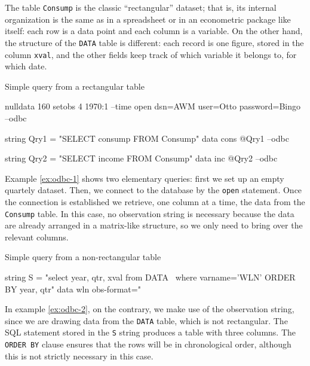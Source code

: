 The table \texttt{Consump} is the classic ``rectangular'' dataset;
that is, its internal organization is the same as in a spreadsheet or
in an econometric package like  itself: each row is a data
point and each column is a variable. On the other hand, the structure
of the \texttt{DATA} table is different: each record is one figure,
stored in the column \texttt{xval}, and the other fields keep track of
which variable it belongs to, for which date.

\begin{script}[htbp]
  \caption{Simple query from a rectangular table}
  \label{ex:odbc-1}
\begin{scode}
nulldata 160
setobs 4 1970:1 --time
open dsn=AWM user=Otto password=Bingo --odbc

string Qry1 = "SELECT consump FROM Consump"
data cons @Qry1 --odbc

string Qry2 = "SELECT income FROM Consump"
data inc @Qry2 --odbc
\end{scode}
\end{script}

Example \ref{ex:odbc-1} shows two elementary queries: first we set up
an empty quartely dataset. Then, we connect to the database by the
\texttt{open} statement. Once the connection is established we
retrieve, one column at a time, the data from the \texttt{Consump}
table. In this case, no observation string is necessary because the
data are already arranged in a matrix-like structure, so we only need
to bring over the relevant columns.

\begin{script}[htbp]
  \caption{Simple query from a non-rectangular table}
  \label{ex:odbc-2}
\begin{scode}
string S = "select year, qtr, xval from DATA \
       where varname='WLN' ORDER BY year, qtr"
data wln obs-format="%
\end{scode}
\end{script}

In example \ref{ex:odbc-2}, on the contrary, we make use of the
observation string, since we are drawing data from the \texttt{DATA}
table, which is not rectangular. The SQL statement stored in the
\texttt{S} string produces a table with three columns. The
\texttt{ORDER BY} clause ensures that the rows will be in
chronological order, although this is not strictly necessary in this
case.

